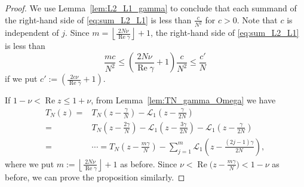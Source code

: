\documentclass[10pt,a4paper]{amsart}
\renewcommand{\L}{\mathcal{L}}
\renewcommand{\Re}{\operatorname{Re}}
\begin{document}
\begin{proof}
We use Lemma~\ref{lem:L2_L1_gamma} to conclude that each summand of the right-hand side of \eqref{eq:sum_L2_L1} is less than $\frac{c}{N^2}$ for $c>0$.
Note that $c$ is independent of $j$.
Since $m=\left\lfloor\frac{2N\nu}{\Re\gamma}\right\rfloor+1$, the right-hand side of \eqref{eq:sum_L2_L1} is less than
\begin{equation*}
  \frac{mc}{N^2}
  \le
  \left(\frac{2N\nu}{\Re\gamma}+1\right)
  \frac{c}{N^2}
  \le
  \frac{c'}{N}
\end{equation*}
if we put $c':=\left(\frac{2c\nu}{\Re\gamma}+1\right)$.
\par
If $1-\nu<\Re{z}\le1+\nu$, from Lemma~\ref{lem:TN_gamma_Omega} we have
\begin{equation*}
\begin{split}
  T_{N}(z)
  =&
  T_{N}\left(z-\frac{\gamma}{N}\right)
  -
  \L_1\left(z-\frac{\gamma}{2N}\right)
  \\
  =&
  T_{N}\left(z-\frac{2\gamma}{N}\right)
  -
  \L_1\left(z-\frac{3\gamma}{2N}\right)
  -
  \L_1\left(z-\frac{\gamma}{2N}\right)
  \\
  =&\cdots
  =
  T_{N}\left(z-\frac{m\gamma}{N}\right)
  -
  \sum_{j=1}^{m}\L_1\left(z-\frac{(2j-1)\gamma}{2N}\right),
\end{split}
\end{equation*}
where we put $m:=\left\lfloor\frac{2N\nu}{\Re\gamma}\right\rfloor+1$ as before.
Since $\nu<\Re\bigl(z-\frac{m\gamma}{N}\bigr)<1-\nu$ as before, we can prove the proposition similarly.
\end{proof}
\end{document}
